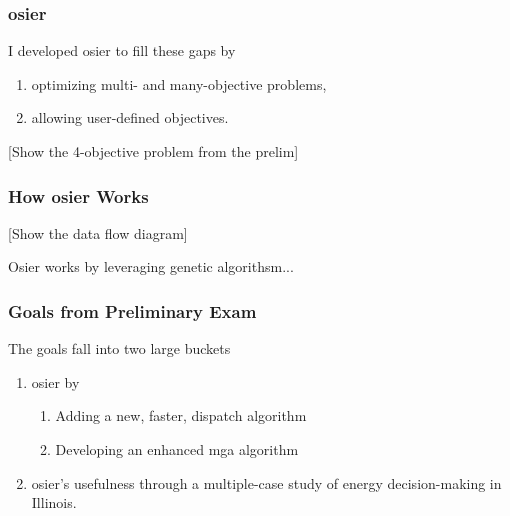 \begin{frame}
    \frametitle{\gls{osier}}
    I developed \gls{osier} to fill these gaps by \cite{dotson_osier_2024}
    \begin{enumerate}
        \item optimizing multi- and many-objective problems,
        \item allowing user-defined objectives.
    \end{enumerate}
    [Show the 4-objective problem from the prelim]
\end{frame}

\begin{frame}
    \frametitle{How \gls{osier} Works}

    [Show the data flow diagram]

    Osier works by leveraging genetic algorithsm... 
\end{frame}

\begin{frame}
    \frametitle{Goals from Preliminary Exam}

    The goals fall into two large buckets

    \begin{enumerate}
        \item {} \gls{osier} by
        \begin{enumerate}
            \item Adding a new, faster, dispatch algorithm
            \item Developing an enhanced \gls{mga} algorithm
        \end{enumerate}
        \item {} \gls{osier}'s usefulness through a 
        multiple-case study of energy decision-making in Illinois.
    \end{enumerate}
\end{frame}
